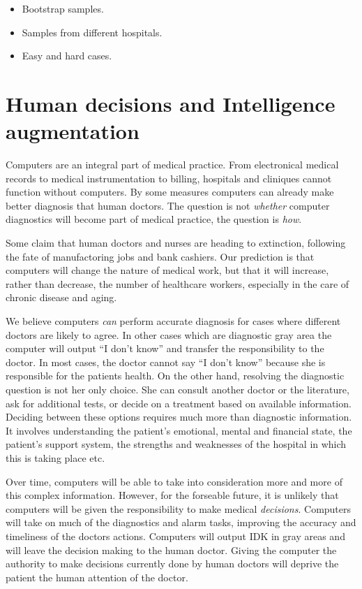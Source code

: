 \documentclass[11pt]{pnas-new}
\begin{document}
\begin{itemize}
  \item Bootstrap samples.
  \item Samples from different hospitals.
  \item Easy and hard cases.
  \end{itemize}

  \section{Human decisions and Intelligence augmentation}

  Computers are an integral part of medical practice. From
  electronical medical records to medical instrumentation to billing,
  hospitals and cliniques cannot function without computers. By some
  measures computers can already make better diagnosis that human
  doctors. The question is not {\em whether} computer diagnostics will
  become part of medical practice, the question is {\em how}.

  Some claim that human doctors and nurses are heading to extinction,
  following the fate of manufactoring jobs and bank cashiers.  Our prediction is
  that computers will change the nature of medical work, but that it
  will increase, rather than decrease, the number of healthcare
  workers, especially in the care of chronic disease and aging.

  We believe computers {\em can} perform accurate diagnosis for cases where
  different doctors are likely to agree. In other cases which are
  diagnostic gray area the computer will output ``I don't know'' and
  transfer the responsibility to the doctor. In most cases, the doctor
  cannot say ``I don't know'' because she is responsible for the
  patients health. On the other hand, resolving the diagnostic
  question is not her only choice. She can consult another doctor or
  the literature, ask for additional tests, or decide on a treatment
  based on available information. Deciding between these options requires much
  more than diagnostic information. It involves understanding the
  patient's emotional, mental and financial state, the patient's
  support system, the strengths and weaknesses of the hospital in
  which this is taking place etc.

  Over time, computers will be able to take into consideration more
  and more of this complex information. However, for the forseable
  future, it is unlikely that computers will be given the
  responsibility to make medical {\em decisions}. Computers
  will take on much of the diagnostics and alarm tasks, improving the
  accuracy and timeliness of the doctors actions. Computers will
  output IDK in gray areas and will leave the decision making to the
  human doctor. Giving the computer the authority to make decisions
  currently done by human doctors will deprive the patient the human
  attention of the doctor.
\end{document}
